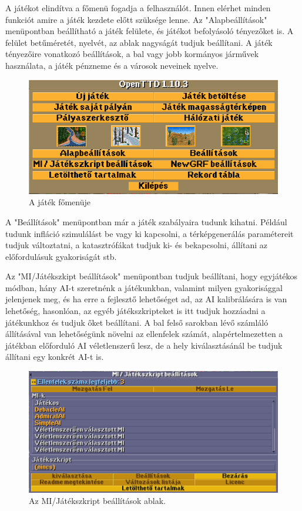 
A játékot elindítva a főmenü fogadja a felhasználót. Innen elérhet minden funkciót amire a játék kezdete előtt szüksége lenne. Az "Alapbeállítások" menüpontban beállítható a játék felülete, és játékot befolyásoló tényezőket is. A felület betűméretét, nyelvét, az ablak nagyságát tudjuk beállítani. A játék tényezőire vonatkozó beállítások, a bal vagy jobb kormányos járművek használata, a játék pénzneme és a városok neveinek nyelve.

\begin{figure}
	\centering
	\includegraphics[scale=0.8]{images/menu.png}
	\caption{A játék főmenüje}
	\label{fig:menu}
\end{figure}

A "Beállítások" menüpontban már a játék szabályaira tudunk kihatni. Például tudunk infláció szimulálást be vagy ki kapcsolni, a térképgenerálás paramétereit tudjuk változtatni, a katasztrófákat tudjuk ki- és bekapcsolni, állítani az előfordulásuk gyakoriságát stb.

Az "MI/Játékszkipt beállítások" menüpontban tudjuk beállítani, hogy egyjátékos módban, hány AI-t szeretnénk a játékunkban, valamint milyen gyakorisággal jelenjenek meg, és ha erre a fejlesztő lehetőséget ad, az AI kalibrálására is van lehetőség, hasonlóan, az egyéb játékszkripteket is itt tudjuk hozzáadni a játékunkhoz és tudjuk őket beállítani. A bal felső sarokban lévő számláló állításával van lehetőségünk növelni az ellenfelek számát, alapértelmezetten a játékban előforduló AI véletlenszerű lesz, de a hely kiválasztásánál be tudjuk állítani egy konkrét AI-t is.

\begin{figure}
	\centering
	\includegraphics[scale=0.6]{images/mibeall.png}
	\caption{Az MI/Játékszkript beállítások ablak.}
	\label{fig:mibeall}
\end{figure}

